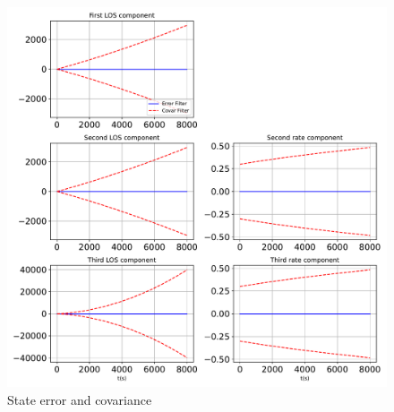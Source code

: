 \begin{figure}[htbp]\centerline{\includegraphics[height=0.9\textwidth, keepaspectratio]{AutoTeX/StatesPlotProp}}\caption{State error and covariance}\label{fig:StatesPlotProp}\end{figure}